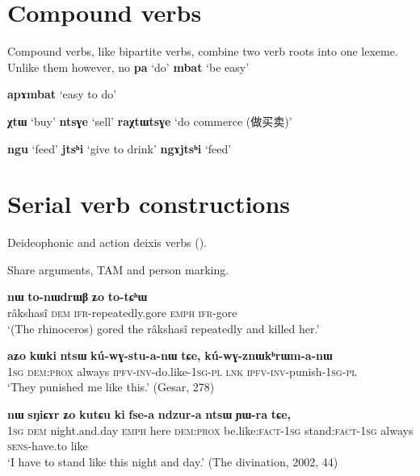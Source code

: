 \documentclass[oldfontcommands,oneside,a4paper,11pt]{article}
\newcommand{\ipa}[1]{{\phon\textbf{#1}}}
\newcommand{\zh}[1]{{\cn #1}}
\newcommand{\jpg}[2]{\ipa{#1} `#2'}
\begin{document}
\section{Compound verbs} \label{sec:}
Compound verbs, like bipartite verbs, combine two verb roots into one lexeme. Unlike them however, no 
\jpg{pa}{do} \jpg{mbat}{be easy}

\jpg{apɤmbat}{easy to do}

\citet{jacques12incorp} \citet{jacques14antipassive} 
\jpg{χtɯ}{buy} \jpg{ntsɣe}{sell} 
\jpg{raχtɯtsɣe}{do commerce (\zh{做买卖})} 


\jpg{ngu}{feed} \jpg{jtsʰi}{give to drink} 
\jpg{ngɤjtsʰi}{feed}

\section{Serial verb constructions} \label{sec:serial}

Deideophonic and action deixis verbs (\citealt{sun12complementation}).

Share arguments, TAM and person marking.

\begin{exe}
\ex \label{ex:totChW2}
\gll 	\ipa{srɯnmɯ} 	\ipa{nɯ} 	\ipa{to-nɯdrɯβ} 	\ipa{ʑo} 	 	\ipa{to-tɕʰɯ} \\
 râkshasî \textsc{dem}  \textsc{ifr}-repeatedly.gore  \textsc{emph}  \textsc{ifr}-gore \\
 \glt `(The rhinoceros) gored the râkshasî repeatedly and killed her.' 
\end{exe}	

\begin{exe}
\ex \label{ex:kuWGstuanW}
\gll 	
 \ipa{aʑo} 	\ipa{kɯki} 	\ipa{ntsɯ} 	\ipa{kú-wɣ-stu-a-nɯ} 	\ipa{tɕe,} 	\ipa{kú-wɣ-znɯkʰrɯm-a-nɯ} \\
 \textsc{1sg} \textsc{dem:prox} always \textsc{ipfv-inv}-do.like-\textsc{1sg-pl} \textsc{lnk} \textsc{ipfv-inv}-punish-\textsc{1sg-pl} \\
 \glt `They punished me like this.' (Gesar, 278)
\end{exe}	

\begin{exe}
\ex \label{ex:ki.fsea}
\gll \ipa{aʑo} 	\ipa{nɯ} 	\ipa{sŋiɕɤr} 	\ipa{ʑo} 	\ipa{kutɕu} 	\ipa{ki} 	\ipa{fse-a} 	\ipa{ndzur-a} 	\ipa{ntsɯ} 	\ipa{ɲɯ-ra} 	\ipa{tɕe,} \\
\textsc{1sg} \textsc{dem} night.and.day \textsc{emph} here \textsc{dem:prox} be.like:\textsc{fact-1sg} stand:\textsc{fact-1sg} always \textsc{sens}-have.to like \\
\glt `I have to stand like this night and day.' (The divination, 2002, 44)
\end{exe}
\end{document}
